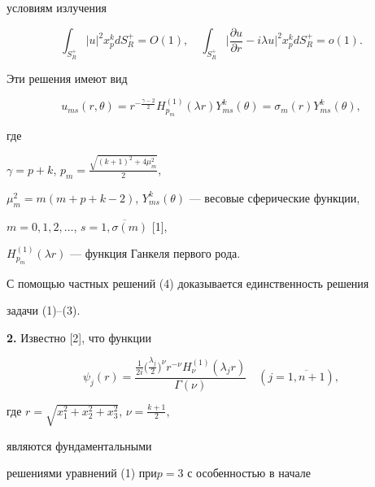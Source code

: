 условиям излучения


$$


\int_{S_R^{+}}|u|^2 x_p^k dS_R^{+}=O(1),\quad


\int_{S_R^{+}}\bigg|\frac{\partial u}{\partial r}-i\lambda


u \bigg|^2 x_p^k dS_R^{+}=o(1).


$$


Эти решения имеют вид


\begin{equation}


u_{ms}(r, \theta)=r^{-\frac{\gamma-2}{2}} H_{p_m}^{(1)}(\lambda


r)Y_{ms}^{k}(\theta)=\sigma_{m}(r)Y_{ms}^k(\theta),


\end{equation}


где


$\gamma=p+k$, $p_m=\frac{\sqrt{(k+1)^2+4\mu_m^2}}{2}$,


$\mu_m^2=m(m+p+k-2)$, $Y_{ms}^k(\theta)$ --- весовые сферические функции,


$m=0,1,2,\dotsc$, $s=\overline{1,\sigma(m)}$ [1],


$H_{p_m}^{(1)}(\lambda r)$ --- функция Ганкеля первого рода.





С помощью частных решений (4) доказывается единственность решения


задачи (1)--(3).


\medskip








{\bf 2.} Известно [2], что функции


\begin{equation}


\psi_j(r)=\frac{\frac{1}{2i}\big(\frac{\lambda_j}{2}\big)^{\nu}r^{-\nu}


H_{\nu}^{(1)}(\lambda_j r)}{\Gamma (\nu)}\quad


(j=\overline{1,n+1}),


\end{equation}


где $r=\sqrt{x_1^2+x_2^2+x_3^2}$, $\nu=\frac{k+1}{2}$,


являются фундаментальными


решениями уравнений (1) при\linebreak $p=3$ с особенностью в начале


